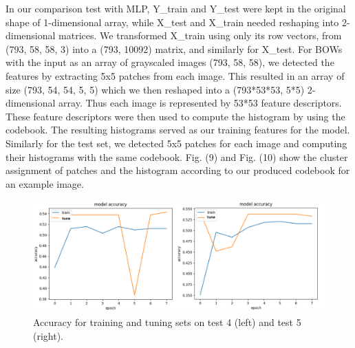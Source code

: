 \documentclass{article}
\begin{document}
 In our comparison test with MLP, Y\_train and Y\_test were kept in
 the original shape of 1-dimensional array, while X\_test and X\_train
 needed reshaping into 2-dimensional matrices. We transformed X\_train
 using only its row vectors, from (793, 58, 58, 3) into a (793, 10092)
 matrix, and similarly for X\_test. For BOWs with the input as an
 array of grayscaled images (793, 58, 58), we detected the features by
 extracting 5x5 patches from each image. This resulted in an array of
 size (793, 54, 54, 5, 5) which we then reshaped into a (793*53*53,
 5*5) 2-dimensional array. Thus each image is represented by 53*53
 feature descriptors. These feature descriptors were then used to
 compute the histogram by using the codebook. The resulting histograms
 served as our training features for the model. Similarly for the test
 set, we detected 5x5 patches for each image and computing
 their histograms with the same codebook.  Fig. (9) and Fig. (10) show
 the cluster assignment of patches and the histogram according to our
 produced codebook for an example image. 

\begin{figure}[ht]
  \vskip 0.2in
  \begin{center}
\centerline{\includegraphics[width=\columnwidth]{graph}}
\caption{Accuracy for training and tuning sets on test 4 (left) and test 5 (right).}
  \label{accuracy}
  \end{center}
  \vskip -0.2in
\end{figure}
\end{document}
